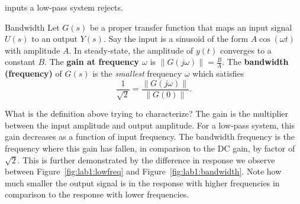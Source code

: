 inputs a low-pass system rejects.
%
\begin{definition}[label={def:bandwidth}]{Bandwidth}
  Let \(G(s)\) be a proper transfer function
  that maps an input signal \(U(s)\) to an output \(Y(s).\)
%
  Say the input is a sinusoid of the form \(A \cos(\omega t)\) with amplitude
  \(A.\) In steady-state, the amplitude of \(y(t)\) converges to a constant
  \(B.\) The \textbf{gain at frequency \(\omega\)} is
  \(\left\|G(j\omega)\right\| = \frac{B}{A}.\)
%
  The \textbf{bandwidth (frequency)} of \(G(s)\) is the \emph{smallest}
  frequency \(\omega\) which satisfies
  \[
    \frac{1}{\sqrt{2}} = \frac{\left\|G(j\omega)\right\|}{\left\|G(0)\right\|}.
  \]
\end{definition}
%
What is the definition above trying to characterize? The
gain is the multiplier between the input amplitude and output amplitude. For
a low-pass system, this gain decreases as a function of input frequency. The
bandwidth frequency is the frequency where this gain has fallen, in comparison
to the DC gain, by factor of \(\sqrt{2}.\) This is further demonstrated
by the difference in response we observe between Figure~\ref{fig:lab1:lowfreq}
and Figure~\ref{fig:lab1:bandwidth}. Note how much smaller the output signal
is in the response with higher frequencies in comparison to the response
with lower frequencies.
%
